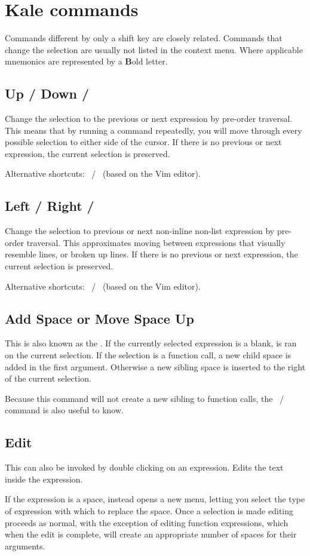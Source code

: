 \chapter{Kale commands}
\newcommand{\shortcut}[3]{\section[#1]{#1 \hfill #2}\label{cmd:#3}}
\newcommand{\pskip}[1]{{\bigskip\par\noindent #1}}

Commands different by only a shift key \keys{\shift} are closely
related. Commands that change the selection are usually not listed in the
context menu. Where applicable mnemonics are represented by a \textbf{B}old
letter.

\shortcut{Up / Down}{\ak{^} / }{up_down}
Change the selection to the previous or next expression by pre-order traversal.
This means that by running a command repeatedly, you will move through every
possible selection to either side of the cursor. If there is no previous or
next expression, the current selection is preserved.
\pskip{Alternative shortcuts: ~/~ (based on the Vim editor).}

\shortcut{Left / Right}{\ak{<} / \ak{>}}{left_right}
Change the selection to previous or next non-inline non-list expression by
pre-order traversal. This approximates moving between expressions that visually
resemble lines, or broken up lines. If there is no previous or next expression,
the current selection is preserved.
\pskip{Alternative shortcuts: ~/~ (based on the Vim editor).}

\shortcut{Add Space or Move Space Up}{\keys{\SPACE}}{smart_space}
This is also known as the . If the currently selected
expression is a blank, \hyperref[cmd:move_up]{} is ran on the
current selection. If the selection is a function call, a new child space
is added in the first argument. Otherwise a new sibling space is inserted to
the right of the current selection. 

Because this command will not create a new sibling to function calls, the 
\hyperref[cmd:new_line]{}
~/~ 
command is also useful to know.

\shortcut{Edit}{\keys{\return}}{edit}
This can also be invoked by double clicking on an expression. Edits the text
inside the expression.

If the expression is a space, instead opens a new menu,
letting you select the type of expression with which to replace the space. 
Once a selection is made editing proceeds as normal, with the exception of
editing function expressions, which when the edit is complete, will create
an appropriate number of spaces for their arguments.

